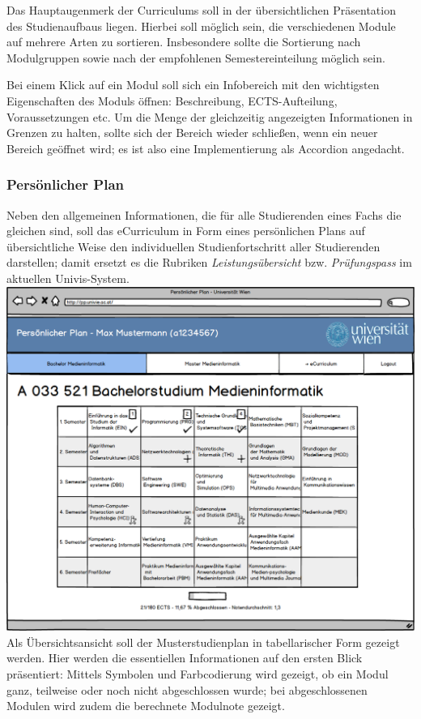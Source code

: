 \documentclass[a4paper,10pt]{scrartcl}
\begin{document}
Das Hauptaugenmerk der Curriculums soll in der übersichtlichen Präsentation des Studienaufbaus liegen. Hierbei soll möglich sein, die verschiedenen Module auf mehrere Arten zu sortieren. Insbesondere sollte die Sortierung nach Modulgruppen sowie nach der empfohlenen Semestereinteilung möglich sein.

Bei einem Klick auf ein Modul soll sich ein Infobereich mit den wichtigsten Eigenschaften des Moduls öffnen: Beschreibung, ECTS-Aufteilung, Voraussetzungen etc. Um die Menge der gleichzeitig angezeigten Informationen in Grenzen zu halten, sollte sich der Bereich wieder schließen, wenn ein neuer Bereich geöffnet wird; es ist also eine Implementierung als Accordion angedacht.

\subsubsection{Persönlicher Plan}

Neben den allgemeinen Informationen, die für alle Studierenden eines Fachs die gleichen sind, soll das eCurriculum in Form eines persönlichen Plans auf übersichtliche Weise den individuellen Studienfortschritt aller Studierenden darstellen; damit ersetzt es die Rubriken \emph{Leistungsübersicht} bzw. \emph{Prüfungspass} im aktuellen Univis-System.\\

 \includegraphics[scale=0.35]{./lowfi-plan.png}\\

Als Übersichtsansicht soll der Musterstudienplan in tabellarischer Form gezeigt werden. Hier werden die essentiellen Informationen auf den ersten Blick präsentiert: Mittels Symbolen und Farbcodierung wird gezeigt, ob ein Modul ganz, teilweise oder noch nicht abgeschlossen wurde; bei abgeschlossenen Modulen wird zudem die berechnete Modulnote gezeigt.
\end{document}
